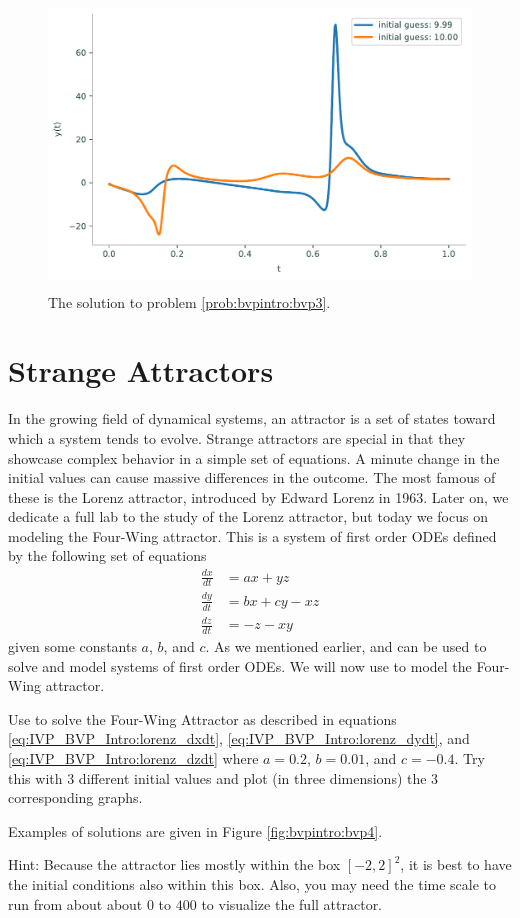 \begin{figure}[H]
    \centering
    \includegraphics[height=3in]{figures/problem3.pdf}
    \caption{The solution to problem \ref{prob:bvpintro:bvp3}.}
    \label{fig:bvpintro:bvp3}
\end{figure}

\section*{Strange Attractors}
In the growing field of dynamical systems, an attractor is a set of states toward which a system tends to evolve.
Strange attractors are special in that they showcase complex behavior in a simple set of equations.
A minute change in the initial values can cause massive differences in the outcome.
The most famous of these is the Lorenz attractor, introduced by Edward Lorenz in 1963.
Later on, we dedicate a full lab to the study of the Lorenz attractor, but today we focus on modeling the Four-Wing attractor.
This is a system of first order ODEs defined by the following set of equations
\begin{align}
    \frac{dx}{dt} &= ax + yz \label{eq:IVP_BVP_Intro:lorenz_dxdt} \\
    \frac{dy}{dt} &= bx + cy - xz \label{eq:IVP_BVP_Intro:lorenz_dydt} \\
    \frac{dz}{dt} &= -z - xy \label{eq:IVP_BVP_Intro:lorenz_dzdt} 
\end{align}
given some constants $a$, $b$, and $c$.
As we mentioned earlier,  and  can be used to solve and model systems of first order ODEs. We will now use  to model the Four-Wing attractor.

\begin{problem}
    \label{prob:bvpintro:bvp4}
Use  to solve the Four-Wing Attractor as described in equations \eqref{eq:IVP_BVP_Intro:lorenz_dxdt}, \eqref{eq:IVP_BVP_Intro:lorenz_dydt}, and \eqref{eq:IVP_BVP_Intro:lorenz_dzdt} where $a=0.2$, $b = 0.01$, and $c = -0.4$. Try this with 3 different initial values and plot (in three dimensions) the 3 corresponding graphs.

Examples of solutions are given in Figure \ref{fig:bvpintro:bvp4}.

Hint: Because the attractor lies mostly within the box $[-2,2]^2$, it is best to have the initial conditions also within this box. Also, you may need the time scale to run from about about $0$ to $400$ to visualize the full attractor.
\end{problem}


